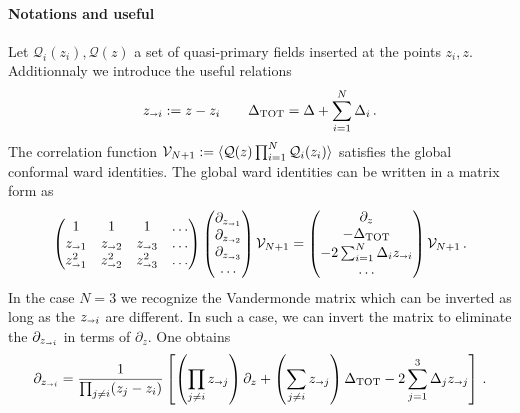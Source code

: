 \documentclass[11pt]{article}
\begin{document}
\paragraph{Notations and useful}
Let $\mathcal{Q}_i(z_i),\mathcal{Q}(z)$ a set of quasi-primary fields inserted at the points $z_i,z$. Additionnaly we introduce the useful relations 
\begin{equation}
  z_{\shortrightarrow i} :=z-z_i \qquad \Delta_{\rm TOT} = \Delta + \sum_{i=1}^{N} \Delta_i\,.
\end{equation}
The correlation function $\mathcal{V}_{N+1}:=\braket{\mathcal{Q}(z)\prod_{i=1}^{N}\mathcal{Q}_i(z_i)}$ satisfies the global conformal ward identities. The global ward identities can be written in a matrix form as
\begin{equation}
  \begin{pmatrix}
  1 & 1 & 1 & \dots \\
  z_{\shortrightarrow 1} & z_{\shortrightarrow 2} & z_{\shortrightarrow 3} & \dots \\
  z_{\shortrightarrow 1}^2 & z_{\shortrightarrow 2}^2 & z_{\shortrightarrow 3}^2 & \dots \\
  \end{pmatrix}
  \begin{pmatrix}
    \partial_{z_{\shortrightarrow 1}} \\
    \partial_{z_{\shortrightarrow 2}} \\
    \partial_{z_{\shortrightarrow 3}} \\
    \dots
  \end{pmatrix}
  \mathcal{V}_{N+1}
  = \begin{pmatrix}
    \partial_z \\
    -\Delta_{\rm TOT} \\
    -2\sum_{i=1}^N \Delta_i z_{\shortrightarrow i} \\
    \dots
  \end{pmatrix}
  \mathcal{V}_{N+1}
  \,.
\end{equation}
In the case $N=3$ we recognize the Vandermonde matrix which can be inverted as long as the $z_{\shortrightarrow i}$ are different. In such a case, we can invert the matrix to eliminate the $ \partial_{z_{\shortrightarrow i}}$ in terms of $\partial_z$. One obtains
\begin{equation}
  \partial_{z_{\shortrightarrow i}}=\frac{1}{\prod_{j\neq i} (z_j-z_i)}\left[\left(\prod_{j \neq i }z_{\shortrightarrow j}\right)\partial_z +\left(\sum_{j\neq i}z_{\shortrightarrow j}\right)\Delta_{\rm TOT}-2\sum_{j=1}^{3}\Delta_j z_{\shortrightarrow j}\right]\,.
\end{equation}
\end{document}
